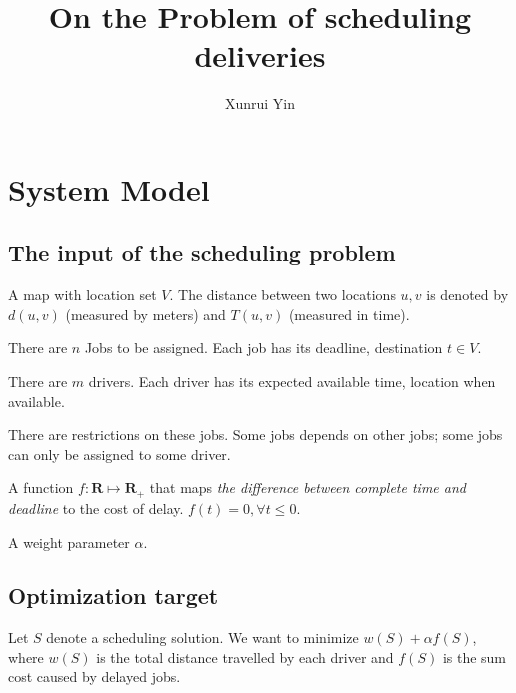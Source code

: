\documentclass[a4paper,draft,12pt,onecolumn]{article}
\theoremstyle{plain}
\begin{document}
\title{On the Problem of scheduling deliveries}

\author{Xunrui Yin}

\maketitle
\section{System Model}

\subsection{The input of the scheduling problem}

A map with location set $V$. The distance between two locations $u,v$ is denoted by $d(u,v)$ (measured by meters) and $T(u,v)$ (measured in time).

There are $n$ Jobs to be assigned. Each job has its deadline, destination $t\in V$.

There are $m$ drivers. Each driver has its expected available time, location when available.

There are restrictions on these jobs. Some jobs depends on other jobs; some jobs can only be assigned to some driver.


A function $f:\mathbf{R} \mapsto \mathbf{R}_+$ that maps {\em the difference between complete time and deadline}  to the cost of delay. $f(t) = 0, \forall t\leq 0$.  

A weight parameter $\alpha$.

\subsection{Optimization target}

Let $S$ denote a scheduling solution. We want to minimize $w(S)+\alpha f(S)$, where $w(S)$ is the total distance travelled by each driver and $f(S)$ is the sum cost caused by delayed jobs.
\end{document}
